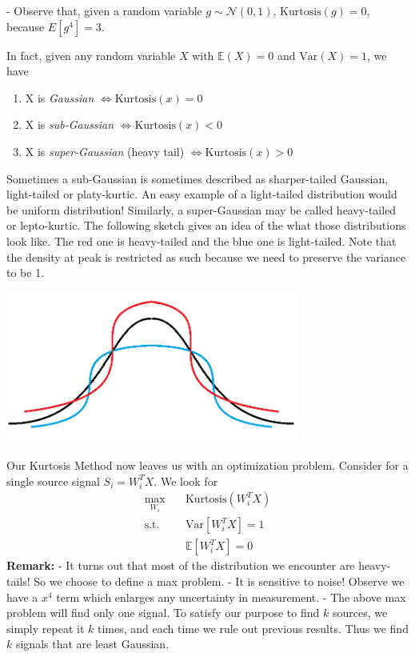 - Observe that, given a random variable $g \sim \mathcal{N}(0,1)$,  $\text{Kurtosis}(g) = 0$, because $E[g^4] = 3$.

In fact, given any random variable $X$ with $\mathbb{E}(X)=0$ and $\text{Var}(X) = 1$, we have
 \begin{enumerate}
     \item  X is \textit{Gaussian} $\iff \text{Kurtosis}(x)=0$
     \item  X is \textit{sub-Gaussian}  $\iff \text{Kurtosis}(x)<0$
     \item  X is \textit{super-Gaussian} (heavy tail) $\iff \text{Kurtosis}(x)>0$
 \end{enumerate}
 Sometimes a sub-Gaussian is sometimes described as sharper-tailed Gaussian, light-tailed or platy-kurtic. An easy example of a light-tailed distribution would be uniform distribution! Similarly, a super-Gaussian may be called heavy-tailed or lepto-kurtic. The following sketch gives an idea of the what those distributions look like. The red one is heavy-tailed and the blue one is light-tailed. Note that the density at peak is restricted as such because we need to preserve the variance to be 1. 
 
\includegraphics[height = 5cm]{chapter_6/files/Gaussians.png}

Our Kurtosis Method now leaves us with an optimization problem. Consider for a single source signal $S_i = W_i^TX$. We look for
\begin{align*}
    \max _{W_i} \quad & \text{Kurtosis}(W_i^TX) \\
    \text{s.t.} \quad & \text{Var}[W_i^T X] = 1 \\
            \quad & \mathbb{E}[W_i^TX] = 0
\end{align*}
\textbf{Remark: } \newline
- It turns out that most of the distribution we encounter are heavy-tails! So we choose to define a max problem.
\newline - It is sensitive to noise! Observe we have a $x^4$ term which enlarges any uncertainty in measurement.
\newline - The above max problem will find only one signal. To satisfy our purpose to find $k$ sources, we simply repeat it $k$ times, and each time we rule out previous results. Thus we find $k$ signals that are least Gaussian.


